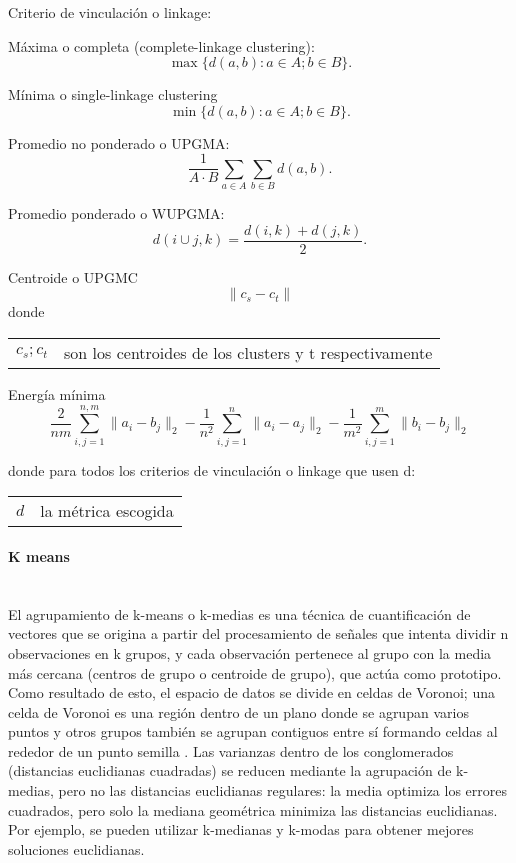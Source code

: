 \documentclass[12pt]{article}
\makeatletter
\newcommand{\subsubsubsection}[1]{\paragraph{#1}\mbox{}\\}
\newenvironment{conditions}
{\par\vspace{\abovedisplayskip}\noindent\begin{tabular}{>{$}l<{$} @{${}={}$} l}}
	{\end{tabular}\par\vspace{\belowdisplayskip}}
\makeatother
\begin{document}
				Criterio de vinculación o linkage:
				
				Máxima o completa (complete-linkage clustering):
				\begin{equation}\label{eq:complete_link}
				\max\{d(a,b):a \in A; b \in B\}.
				\end{equation}
				
				Mínima o single-linkage clustering
				\begin{equation}\label{eq:single_link}
				\min\{d(a,b):a \in A; b \in B\}.
				\end{equation}
				
				Promedio no ponderado o UPGMA:
				\begin{equation}\label{eq:UPGMA_link}
				\frac{1}{A \cdot B}\sum_{a \in A}\sum_{b \in B}d(a,b).
				\end{equation}
				
				Promedio ponderado o WUPGMA:
				\begin{equation}\label{eq:WUPGMA_link}
				d(i \cup j, k) =  \frac{d(i,k)+d(j,k)}{2}.
				\end{equation}
				
				Centroide o  UPGMC
				\begin{equation}\label{eq:UPGMC_link}
				\parallel c_s - c_t \parallel
				\end{equation}
				donde
				\begin{conditions}
					c_s ; c_t & son los centroides de los clusters y t respectivamente 
				\end{conditions}
				
				Energía mínima
				\begin{equation}\label{eq:energ_min}
				\frac{2}{nm}\sum_{i,j=1}^{n,m}\parallel a_i-b_j \parallel_2-\frac{1}{n^2}\sum_{i,j=1}^n \parallel a_i-a_j \parallel_2-\frac{1}{m^2}\sum_{i,j=1}^m \parallel b_i-b_j \parallel_2
				\end{equation}
				
				
				donde para todos los criterios de vinculación o linkage que usen d:
				\begin{conditions}
					d & la métrica escogida 
				\end{conditions}
				
				\subsubsubsection{K means}
				El agrupamiento de k-means o k-medias es una técnica de cuantificación de vectores que se origina a partir del procesamiento de señales que intenta dividir n observaciones en k grupos, y cada observación pertenece al grupo con la media más cercana (centros de grupo o centroide de grupo), que actúa como prototipo. Como resultado de esto, el espacio de datos se divide en celdas de Voronoi; una celda de Voronoi es una región dentro de un plano donde se agrupan varios puntos y otros grupos también se agrupan contiguos entre sí formando celdas al rededor de un punto semilla \cite{Zdimalova2021}. Las varianzas dentro de los conglomerados (distancias euclidianas cuadradas) se reducen mediante la agrupación de k-medias, pero no las distancias euclidianas regulares: la media optimiza los errores cuadrados, pero solo la mediana geométrica minimiza las distancias euclidianas. Por ejemplo, se pueden utilizar k-medianas y k-modas para obtener mejores soluciones euclidianas. \cite{Chase2018}
				
\end{document}
